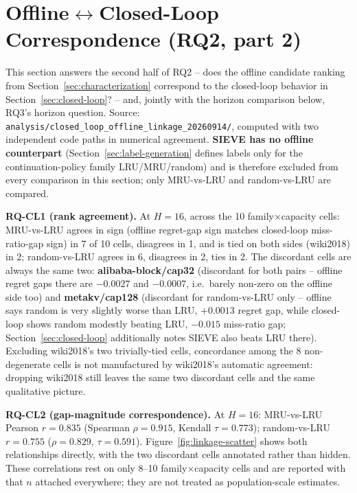 \section{Offline$\leftrightarrow$Closed-Loop Correspondence (RQ2, part 2)}
\label{sec:linkage}

This section answers the second half of RQ2 -- does the offline candidate
ranking from Section~\ref{sec:characterization} correspond to the
closed-loop behavior in Section~\ref{sec:closed-loop}? -- and, jointly
with the horizon comparison below, RQ3's horizon question. Source:
\texttt{analysis/closed\_loop\_offline\_linkage\_20260914/}, computed with
two independent code paths in numerical agreement. \textbf{SIEVE has no
offline counterpart} (Section~\ref{sec:label-generation} defines labels
only for the continuation-policy family LRU/MRU/random) and is therefore
excluded from every comparison in this section; only MRU-vs-LRU and
random-vs-LRU are compared.

\textbf{RQ-CL1 (rank agreement).} At $H=16$, across the 10 family$\times$capacity
cells: MRU-vs-LRU agrees in sign (offline regret-gap sign matches
closed-loop miss-ratio-gap sign) in 7 of 10 cells, disagrees in 1, and is
tied on both sides (wiki2018) in 2; random-vs-LRU agrees in 6, disagrees
in 2, ties in 2. The discordant cells are always the same two:
\textbf{alibaba-block/cap32} (discordant for both pairs -- offline regret
gaps there are $-0.0027$ and $-0.0007$, i.e.\ barely non-zero on the
offline side too) and \textbf{metakv/cap128} (discordant for random-vs-LRU
only -- offline says random is very slightly worse than LRU, $+0.0013$
regret gap, while closed-loop shows random modestly beating LRU, $-0.015$
miss-ratio gap; Section~\ref{sec:closed-loop} additionally notes SIEVE
also beats LRU there). Excluding wiki2018's two trivially-tied cells,
concordance among the 8 non-degenerate cells is not manufactured by
wiki2018's automatic agreement: dropping wiki2018 still leaves the same
two discordant cells and the same qualitative picture.

\textbf{RQ-CL2 (gap-magnitude correspondence).} At $H=16$: MRU-vs-LRU
Pearson $r=0.835$ (Spearman $\rho=0.915$, Kendall $\tau=0.773$);
random-vs-LRU $r=0.755$ ($\rho=0.829$, $\tau=0.591$). Figure~\ref{fig:linkage-scatter}
shows both relationships directly, with the two discordant cells
annotated rather than hidden. These correlations rest on only 8--10
family$\times$capacity cells and are reported with that $n$
attached everywhere; they are not treated as population-scale estimates.

